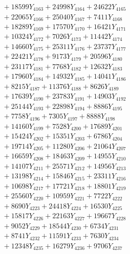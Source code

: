 \documentclass[a4paper,10pt]{article}
\begin{document}
{\begin{align}
&\;  + 18599 Y_{4163} + 24998 Y_{4164} + 24622 Y_{4165} \\[0.3ex]
&\;  + 22065 Y_{4166} + 25040 Y_{4167} + 7411 Y_{4168} \\[0.5ex]\allowbreak
&\;  + 18289 Y_{4169} + 17570 Y_{4170} + 16421 Y_{4171} \\[0.3ex]
&\;  + 10324 Y_{4172} + 7026 Y_{4173} + 11442 Y_{4174} \\[0.3ex]
&\;  + 14660 Y_{4175} + 25311 Y_{4176} + 23737 Y_{4177} \\[0.3ex]
&\;  + 22421 Y_{4178} + 9173 Y_{4179} + 20596 Y_{4180} \\[0.3ex]
&\;  + 23117 Y_{4181} + 7768 Y_{4182} + 12632 Y_{4183} \\[0.3ex]
&\;  + 17960 Y_{4184} + 14932 Y_{4185} + 14041 Y_{4186} \\[0.3ex]
&\;  + 8215 Y_{4187} + 11376 Y_{4188} + 8626 Y_{4189} \\[0.3ex]
&\;  + 17639 Y_{4190} + 23783 Y_{4191} + 14903 Y_{4192} \\[0.3ex]
&\;  + 25144 Y_{4193} + 22898 Y_{4194} + 8886 Y_{4195} \\[0.3ex]
&\;  + 7758 Y_{4196} + 7305 Y_{4197} + 8888 Y_{4198} \\[0.5ex]\allowbreak
&\;  + 14160 Y_{4199} + 7528 Y_{4200} + 17689 Y_{4201} \\[0.3ex]
&\;  + 15424 Y_{4202} + 15351 Y_{4203} + 6786 Y_{4204} \\[0.3ex]
&\;  + 19714 Y_{4205} + 11280 Y_{4206} + 21064 Y_{4207} \\[0.3ex]
&\;  + 16659 Y_{4208} + 18463 Y_{4209} + 14955 Y_{4210} \\[0.3ex]
&\;  + 14107 Y_{4211} + 25571 Y_{4212} + 14956 Y_{4213} \\[0.3ex]
&\;  + 13198 Y_{4214} + 15846 Y_{4215} + 23311 Y_{4216} \\[0.3ex]
&\;  + 10698 Y_{4217} + 17721 Y_{4218} + 18801 Y_{4219} \\[0.3ex]
&\;  + 25560 Y_{4220} + 10959 Y_{4221} + 7722 Y_{4222} \\[0.3ex]
&\;  + 8690 Y_{4223} + 24418 Y_{4224} + 16530 Y_{4225} \\[0.3ex]
&\;  + 15817 Y_{4226} + 22163 Y_{4227} + 19667 Y_{4228} \\[0.5ex]\allowbreak
&\;  + 9052 Y_{4229} + 18544 Y_{4230} + 6734 Y_{4231} \\[0.3ex]
&\;  + 8741 Y_{4232} + 11591 Y_{4233} + 7630 Y_{4234} \\[0.3ex]
&\;  + 12348 Y_{4235} + 16279 Y_{4236} + 9706 Y_{4237} \\[0.3ex]

\end{align}}
\end{document}
